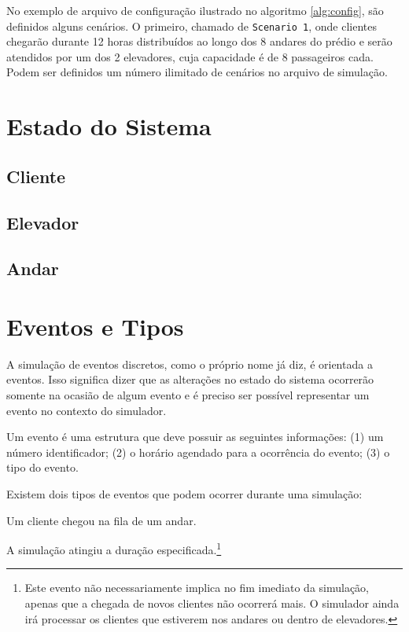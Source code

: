 No exemplo de arquivo de configuração ilustrado no algoritmo \ref{alg:config},
são definidos alguns cenários. O primeiro, chamado de \texttt{Scenario 1}, onde
clientes chegarão durante 12 horas distribuídos ao longo dos 8 andares do prédio
e serão atendidos por um dos 2 elevadores, cuja capacidade é de 8 passageiros
cada. Podem ser definidos um número ilimitado de cenários no arquivo de
simulação.

\section{\label{model:state}Estado do Sistema}

\lipsum[3]

\subsection{\label{model:state:client}Cliente}

\lipsum[3]

\subsection{\label{model:state:elevator}Elevador}

\lipsum[3]

\subsection{\label{model:state:floor}Andar}

\lipsum[3]

\section{\label{model:events}Eventos e Tipos}

A simulação de eventos discretos, como o próprio nome já diz, é orientada a
eventos. Isso significa dizer que as alterações no estado do sistema ocorrerão
somente na ocasião de algum evento e é preciso ser possível representar um
evento no contexto do simulador.

Um evento é uma estrutura que deve possuir as seguintes informações: (1) um
número identificador; (2) o horário agendado para a ocorrência do evento; (3) o
tipo do evento.

Existem dois tipos de eventos que podem ocorrer durante uma
simulação:

\begin{description}[leftmargin=!,labelwidth=\widthof{\bfseries Chegada de cliente}]

  \item[Chegada de cliente] Um cliente chegou na fila de um andar.

  \item[Fim da simulação] A simulação atingiu a duração
especificada.\footnote{Este evento não necessariamente implica no fim imediato
da simulação, apenas que a chegada de novos clientes não ocorrerá mais. O
simulador ainda irá processar os clientes que estiverem nos andares ou dentro de
elevadores.}

\end{description}

